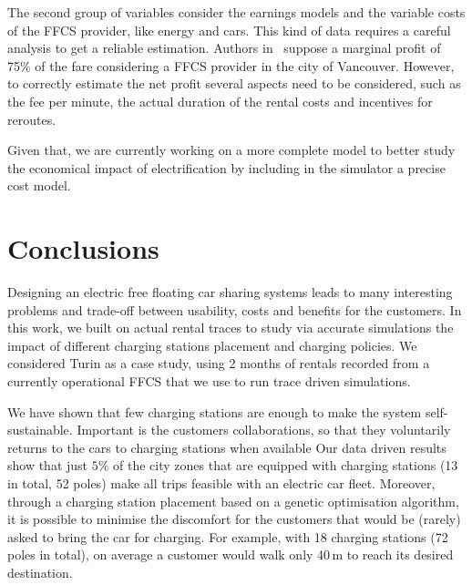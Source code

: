 The second group of variables consider the earnings models and the variable costs of the FFCS provider, like energy and cars. This kind of data requires a careful analysis to get a reliable estimation. Authors in~\cite{8_Wagner2015DataAF} suppose a marginal profit of 75\% of the fare considering a FFCS provider in the city of Vancouver. However, to correctly estimate the net profit several aspects need to be considered, such as the fee per minute, the actual duration of the rental costs and incentives for reroutes.

Given that, we are currently work\textsl{}ing on a more complete model to better study the economical impact of electrification by including in the simulator a precise cost model. 


\section{Conclusions}
\label{sec:7_9_conclusion}

Designing an electric free floating car sharing systems leads to many interesting problems and trade-off between usability, costs and benefits for the customers. 
In this work, we built on actual rental traces to study via accurate simulations the impact of different charging stations placement and charging policies. 
We considered Turin as a case study, using 2 months of rentals recorded from a currently operational FFCS that we use to run trace driven simulations.


We have shown that few charging stations are enough to make the system self-sustainable. Important is the customers collaborations, so that they voluntarily returns to the cars to charging stations when available
Our data driven results show that just $5\%$ of the city zones that are equipped with charging stations (13 in total, 52 poles) make all trips feasible with an electric car fleet. Moreover, through a charging station placement based on a genetic optimisation algorithm, it is possible to minimise the discomfort for the customers that would be (rarely) asked to bring the car for charging. For example, with 18 charging stations (72 poles in total), on average a customer would walk only 40\,m to reach its desired destination. 



